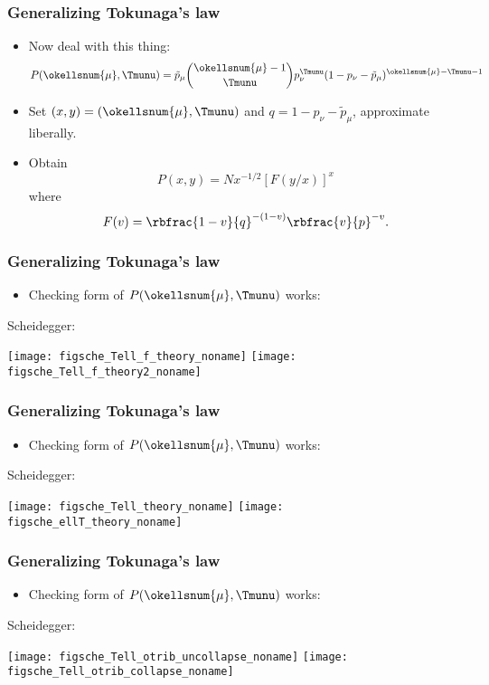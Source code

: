 \begin{frame}[label=]
  \frametitle{Generalizing Tokunaga's law}

  \begin{itemize}
  \item<1-> 
    Now deal with this thing:
    $$
    P(\okellsnum{\mu},\Tmunu) = \tilde{p}_{\mu}
    \binom{\okellsnum{\mu} - 1}{\Tmunu}
    p_{\nu}^{\Tmunu}
    ( 1 - p_\nu - \tilde{p}_{\mu})^{\okellsnum{\mu} - \Tmunu - 1}
    $$
  \item<2->
    Set $(x,y) = (\okellsnum{\mu}, \Tmunu)$ and $q = 1 - p_\nu - \tilde{p}_{\mu}$,
    approximate liberally.
  \item<3->
    Obtain
    $$
    P(x,y) = N x^{-1/2} \left[ F(y/x) \right]^{x}
    $$
    where
    $$
    F(v) = \rbfrac{1-v}{q}^{-(1-v)} \rbfrac{v}{p}^{-v}.
    $$
  \end{itemize}

\end{frame}

\begin{frame}[label=]
  \frametitle{Generalizing Tokunaga's law}

  \begin{itemize}
  \item Checking form of $P(\okellsnum{\mu},\Tmunu)$ works:
  \end{itemize}

  Scheidegger:

    \texttt{[image: figsche\_Tell\_f\_theory\_noname]}
    \texttt{[image: figsche\_Tell\_f\_theory2\_noname]}

\end{frame}

\begin{frame}[label=]
  \frametitle{Generalizing Tokunaga's law}

  \begin{itemize}
  \item Checking form of $P(\okellsnum{\mu},\Tmunu)$ works:
  \end{itemize}

  Scheidegger:
  
    \texttt{[image: figsche\_Tell\_theory\_noname]}
    \texttt{[image: figsche\_ellT\_theory\_noname]} 

\end{frame}

\begin{frame}[label=]
  \frametitle{Generalizing Tokunaga's law}

  \begin{itemize}
  \item Checking form of $P(\okellsnum{\mu},\Tmunu)$ works:
  \end{itemize}

  Scheidegger:

      \texttt{[image: figsche\_Tell\_otrib\_uncollapse\_noname]}
      \texttt{[image: figsche\_Tell\_otrib\_collapse\_noname]}

\end{frame}

